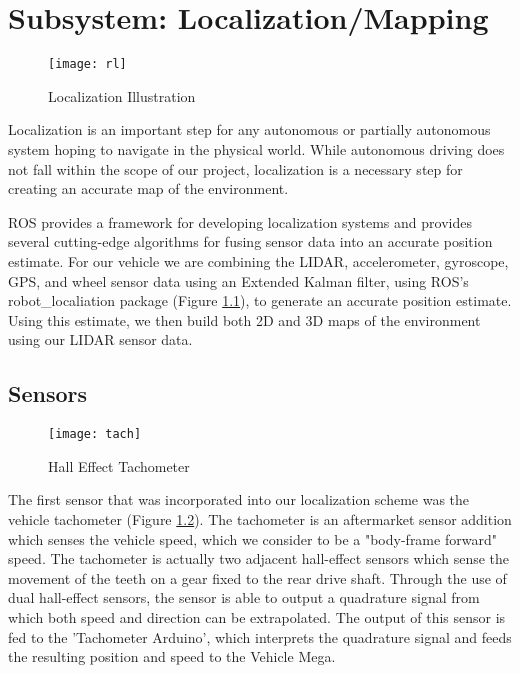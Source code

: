 \chapter{Subsystem: Localization/Mapping} \label{chap:Localization}


\begin{figure}[H]
	\centerline{\texttt{[image: rl]}}
	\caption[]{Localization Illustration \cite{clearpath}}
	\label{fig:robotlocalization}
\end{figure}

Localization is an important step for any autonomous or partially autonomous system hoping to navigate in the physical world. While autonomous driving does not fall within the scope of our project, localization is a necessary step for creating an accurate map of the environment. 

ROS provides a framework for developing localization systems and provides several cutting-edge algorithms for fusing sensor data into an accurate position estimate. For our vehicle we are combining the LIDAR, accelerometer, gyroscope, GPS, and wheel sensor data using an Extended Kalman filter, using ROS's robot\_localiation package (Figure \ref{fig:robotlocalization}), to generate an accurate position estimate. Using this estimate, we then build both 2D and 3D maps of the environment using our LIDAR sensor data. 

\section{Sensors}


\begin{figure}[h!]
	\centerline{\texttt{[image: tach]}}
	\caption[]{Hall Effect Tachometer}
	\label{fig:tach}
\end{figure}

The first sensor that was incorporated into our localization scheme was the vehicle tachometer (Figure \ref{fig:tach}). The tachometer is an aftermarket sensor addition which senses the vehicle speed, which we consider to be a "body-frame forward" speed. The tachometer is actually two adjacent hall-effect sensors which sense the movement of the teeth on a gear fixed to the rear drive shaft. Through the use of dual hall-effect sensors, the sensor is able to output a quadrature signal from which both speed and direction can be extrapolated. The output of this sensor is fed to the 'Tachometer Arduino', which interprets the quadrature signal and feeds the resulting position and speed to the Vehicle Mega.

